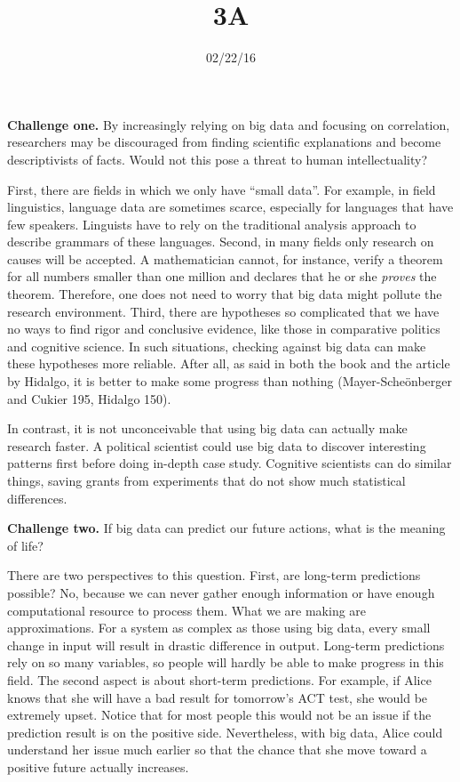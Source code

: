 \documentclass{writing}
\title{3A}
\date{02/22/16}
\begin{document}
\maketitle

\textbf{Challenge one.} By increasingly relying on big data and focusing
on correlation, researchers may be discouraged from finding scientific
explanations and become descriptivists of facts. Would not this pose a
threat to human intellectuality?

First, there are fields in which we only have ``small data''. For
example, in field linguistics, language data are sometimes scarce,
especially for languages that have few speakers. Linguists have to rely
on the traditional analysis approach to describe grammars of these
languages. Second, in many fields only research on causes will be
accepted. A mathematician cannot, for instance, verify a theorem for all
numbers smaller than one million and declares that he or she
\emph{proves} the theorem. Therefore, one does not need to worry that
big data might pollute the research environment. Third, there are
hypotheses so complicated that we have no ways to find rigor and
conclusive evidence, like those in comparative politics and cognitive
science. In such situations, checking against big data can make these
hypotheses more reliable. After all, as said in both the book and the
article by Hidalgo, it is better to make some progress than nothing
(Mayer-Scheönberger and Cukier 195, Hidalgo 150).

In contrast, it is not unconceivable that using big data can actually
make research faster. A political scientist could use big data to
discover interesting patterns first before doing in-depth case study.
Cognitive scientists can do similar things, saving grants from
experiments that do not show much statistical differences.

\textbf{Challenge two.} If big data can predict our future actions, what
is the meaning of life?

There are two perspectives to this question. First, are long-term
predictions possible? No, because we can never gather enough information
or have enough computational resource to process them. What we are
making are approximations. For a system as complex as those using big
data, every small change in input will result in drastic difference in
output. Long-term predictions rely on so many variables, so people will
hardly be able to make progress in this field. The second aspect is
about short-term predictions. For example, if Alice knows that she will
have a bad result for tomorrow's ACT test, she would be extremely upset.
Notice that for most people this would not be an issue if the prediction
result is on the positive side. Nevertheless, with big data, Alice could
understand her issue much earlier so that the chance that she move
toward a positive future actually increases.
\end{document}
